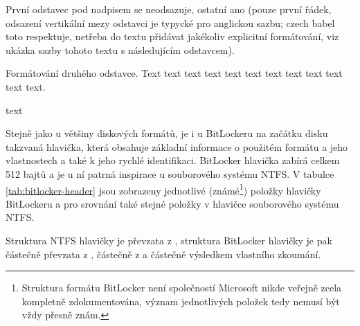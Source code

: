 
První odstavec pod nadpisem se neodsazuje, ostatní ano (pouze první řádek, odsazení vertikální mezy odstavci je typycké pro anglickou sazbu; czech babel toto respektuje, netřeba do textu přidávat jakékoliv explicitní formátování, viz ukázka sazby tohoto textu s následujícím odstavcem).

Formátování druhého odstavce. Text text text text text text text text text text text text.



text




Stejně jako u většiny diskových formátů, je i u BitLockeru na začátku disku takzvaná hlavička, která obsahuje základní informace o použitém formátu a jeho vlastnostech a také k jeho rychlé identifikaci. BitLocker hlavička zabírá celkem 512 bajtů a je u ní patrná inspirace u souborového systému NTFS. V tabulce \ref{tab:bitlocker-header} jsou zobrazeny jednotlivé (známé\footnote{Struktura formátu BitLocker není společností Microsoft nikde veřejně zcela kompletně zdokumentována, význam jednotlivých položek tedy nemusí být vždy přesně znám.}) položky hlavičky BitLockeru a pro srovnání také stejné položky v hlavičce souborového systému NTFS.

Struktura NTFS hlavičky je převzata z \cite{Carrier2005}, struktura BitLocker hlavičky je pak částečně převzata z \cite{j2YgJeTq3IrWJRcd}, částečně z \cite{Ferguson2006} a částečně výsledkem vlastního zkoumání.

